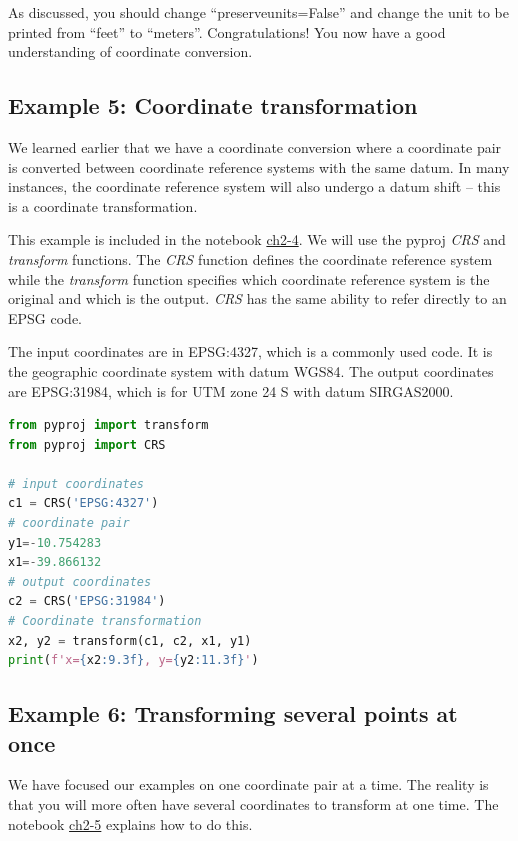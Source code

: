 \documentclass[a4paper , 12pt]{book}
\begin{document}
As discussed, you should change “preserve\textunderscore units=False” and change the unit to be printed from “feet” to “meters”. Congratulations! You now have a good understanding of coordinate conversion.

\subsection*{Example 5: Coordinate transformation}

We learned earlier that we have a coordinate conversion where a coordinate pair is converted between coordinate reference systems with the same datum. In many instances, the coordinate reference system will also undergo a datum shift – this is a coordinate transformation.

This example is included in the notebook \href{https://github.com/nfcd/compGeo/blob/master/source/notebooks/ch2-4.ipynb}{ch2-4}. We will use the pyproj \textit{CRS} and \textit{transform} functions. The \textit{CRS} function defines the coordinate reference system while the \textit{transform} function specifies which coordinate reference system is the original and which is the output. \textit{CRS} has the same ability to refer directly to an EPSG code.

The input coordinates are in EPSG:4327, which is a commonly used code. It is the geographic coordinate system with datum WGS84. The output coordinates are EPSG:31984, which is for UTM zone 24 S with datum SIRGAS2000.

\begin{center}
\begin{lstlisting}[language=Python, frame=single]
from pyproj import transform
from pyproj import CRS

# input coordinates
c1 = CRS('EPSG:4327')
# coordinate pair
y1=-10.754283
x1=-39.866132
# output coordinates
c2 = CRS('EPSG:31984')
# Coordinate transformation
x2, y2 = transform(c1, c2, x1, y1)
print(f'x={x2:9.3f}, y={y2:11.3f}')
\end{lstlisting}
\end{center}

\subsection*{Example 6: Transforming several points at once}

We have focused our examples on one coordinate pair at a time. The reality is that you will more often have several coordinates to transform at one time. The notebook \href{https://github.com/nfcd/compGeo/blob/master/source/notebooks/ch2-5.ipynb}{ch2-5} explains how to do this.
\end{document}
